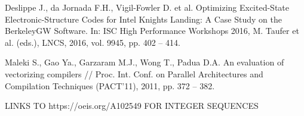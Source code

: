 \documentclass[
11pt,%
tightenlines,%
twoside,%
onecolumn,%
nofloats,%
nobibnotes,%
nofootinbib,%
superscriptaddress,%
noshowpacs,%
centertags]%
{revtex4}
\begin{document}
\begin{thebibliography}{99}
Deslippe J., da Jornada F.H., Vigil-Fowler D. et al. Optimizing Excited-State Electronic-Structure Codes for Intel Knights Landing: A Case Study on the BerkeleyGW Software. In: ISC High Performance Workshops 2016, M. Taufer et al. (eds.), LNCS, 2016, vol. 9945, pp. 402 -- 414.

Maleki S., Gao Ya., Garzaram M.J., Wong T., Padua D.A. An evaluation of vectorizing compilers // Proc. Int. Conf. on Parallel Architectures and Compilation Techniques (PACT'11), 2011, pp. 372 -- 382.

LINKS TO https://oeis.org/A102549 FOR INTEGER SEQUENCES




\end{thebibliography}
\end{document}
